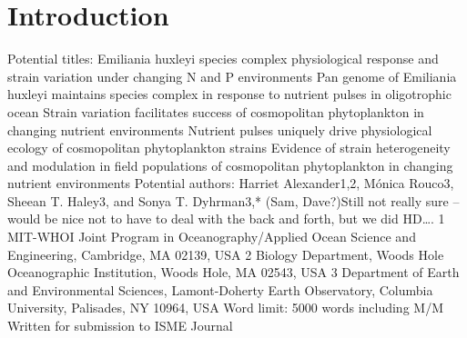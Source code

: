 \section{Introduction}
 Potential titles: 
Emiliania huxleyi species complex physiological response and strain variation under changing N and P environments
Pan genome of Emiliania huxleyi maintains species complex in response to nutrient pulses in oligotrophic ocean 
Strain variation facilitates success of cosmopolitan phytoplankton in changing nutrient environments 
Nutrient pulses uniquely drive physiological ecology of cosmopolitan phytoplankton strains
Evidence of strain heterogeneity and modulation in field populations of cosmopolitan phytoplankton in changing nutrient environments
Potential authors: 
Harriet Alexander1,2, Mónica Rouco3, Sheean T. Haley3, and Sonya T. Dyhrman3,* (Sam, Dave?)Still not really sure – would be nice not to have to deal with the back and forth, but we did HD….
1 MIT-WHOI Joint Program in Oceanography/Applied Ocean Science and Engineering, Cambridge, MA 02139, USA
2 Biology Department, Woods Hole Oceanographic Institution, Woods Hole, MA 02543, USA
3 Department of Earth and Environmental Sciences, Lamont-Doherty Earth Observatory, Columbia University, Palisades, NY 10964, USA
Word limit: 5000 words including M/M
Written for submission to ISME Journal





